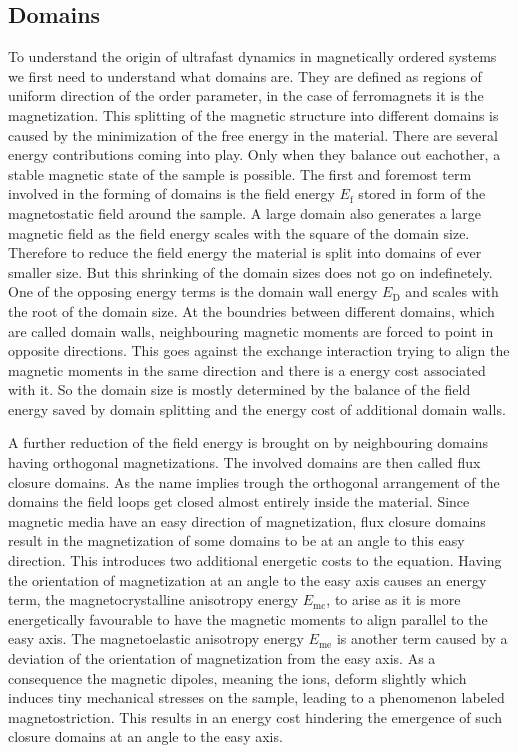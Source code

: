\subsection{Domains}
To understand the origin of ultrafast dynamics in magnetically ordered systems we first need to understand what domains are.
They are defined as regions of uniform direction of the order parameter, in the case of ferromagnets it is the magnetization.
This splitting of the magnetic structure into different domains is caused by the minimization of the free energy in the material.
There are several energy contributions coming into play.
Only when they balance out eachother, a stable magnetic state of the sample is possible.
The first and foremost term involved in the forming of domains is the field energy $E_{\text{f}}$ stored in form of the magnetostatic field around the sample.
A large domain also generates a large magnetic field as the field energy scales with the square of the domain size.
Therefore to reduce the field energy the material is split into domains of ever smaller size.
But this shrinking of the domain sizes does not go on indefinetely.
One of the opposing energy terms is the domain wall energy $E_{\text{D}}$ and scales with the root of the domain size.
At the boundries between different domains, which are called domain walls, neighbouring magnetic moments are forced to point in opposite directions.
This goes against the exchange interaction trying to align the magnetic moments in the same direction and there is a energy cost associated with it.
So the domain size is mostly determined by the balance of the field energy saved by domain splitting and the energy cost of additional domain walls.

A further reduction of the field energy is brought on by neighbouring domains having orthogonal magnetizations.
The involved domains are then called flux closure domains.
As the name implies trough the orthogonal arrangement of the domains the field loops get closed almost entirely inside the material.
Since magnetic media have an easy direction of magnetization, flux closure domains result in the magnetization of some domains to be at an angle to this easy direction.
This introduces two additional energetic costs to the equation.
Having the orientation of magnetization at an angle to the easy axis causes an energy term, the magnetocrystalline anisotropy energy $E_{\text{mc}}$, to arise as it is more energetically favourable to have the magnetic moments to align parallel to the easy axis.
The magnetoelastic anisotropy energy $E_{\text{me}}$ is another term caused by a deviation of the orientation of magnetization from the easy axis.
As a consequence the magnetic dipoles, meaning the ions, deform slightly which induces tiny mechanical stresses on the sample, leading to a phenomenon labeled magnetostriction.
This results in an energy cost hindering the emergence of such closure domains at an angle to the easy axis.


